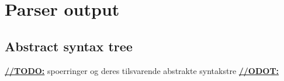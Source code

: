 \section{Parser output}
\subsection{Abstract syntax tree}
\underline{\textbf{\LARGE //TODO:}}
spoerringer og deres tilsvarende abstrakte syntakstre
\underline{\textbf{\LARGE //ODOT:}}